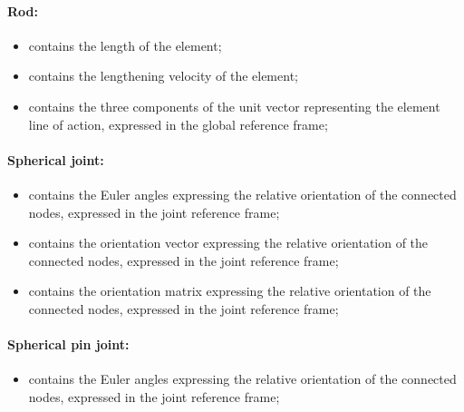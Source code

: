 \paragraph{Rod:}
\begin{itemize}
\item {} contains the length of the
  element;
\item {} contains the lengthening
  velocity of the element;
\item {} contains the three components of
  the unit vector representing the element line of action, expressed 
  in the global reference frame;
\end{itemize}

\paragraph{Spherical joint:}
\begin{itemize}
\item {} contains the Euler angles 
  expressing the relative orientation of the connected nodes, expressed in 
  the joint reference frame;
\item {} contains the orientation vector
  expressing the relative orientation of the connected nodes, expressed in 
  the joint reference frame;
\item {} contains the orientation matrix
  expressing the relative orientation of the connected nodes, expressed in 
  the joint reference frame;
\end{itemize}

\paragraph{Spherical pin joint:}
\begin{itemize}
\item {} contains the Euler angles 
  expressing the relative orientation of the connected nodes, expressed in 
  the joint reference frame;
\end{itemize}

